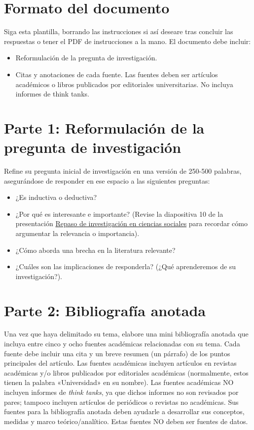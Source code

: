 \documentclass[11pt]{article}
\begin{document}
\section*{Formato del documento}
Siga esta plantilla, borrando las instrucciones si así deseare tras concluir las respuestas o tener el PDF de instrucciones a la mano. El documento debe incluir:
\begin{itemize}
    \item Reformulación de la pregunta de investigación.
    \item Citas y anotaciones de cada fuente. Las fuentes deben ser artículos académicos o libros publicados por editoriales universitarias. No incluya informes de think tanks.
\end{itemize}
\onehalfspacing
\section*{Parte 1: Reformulación de la pregunta de investigación}

Refine su pregunta inicial de investigación en una versión de 250-500 palabras, asegurándose de responder en ese espacio a las siguientes preguntas:
\begin{itemize}
    \item ¿Es inductiva o deductiva?
    \item ¿Por qué es interesante e importante? (Revise la diapositiva 10 de la presentación \href{https://github.com/RashidCJ/SOCI-4186/blob/main/Gu%C3%ADas%20y%20manuales%204186/Repaso%20de%20investigaci%C3%B3n%20en%20ciencias%20sociales.pdf}{Repaso de investigación en ciencias sociales} para recordar cómo argumentar la relevancia o importancia).
    \item ¿Cómo aborda una brecha en la literatura relevante?
    \item ¿Cuáles son las implicaciones de responderla? (¿Qué aprenderemos de su investigación?).
\end{itemize}

\section*{Parte 2: Bibliografía anotada}

Una vez que haya delimitado su tema, elabore una mini bibliografía anotada que incluya entre cinco y ocho fuentes académicas relacionadas con su tema. Cada fuente debe incluir una cita y un breve resumen (un párrafo) de los puntos principales del artículo. Las fuentes académicas incluyen artículos en revistas académicas y/o libros publicados por editoriales académicas (normalmente, estos tienen la palabra «Universidad» en su nombre). Las fuentes académicas NO incluyen informes de \textit{think tanks}, ya que dichos informes no son revisados por pares; tampoco incluyen artículos de periódicos o revistas no académicas. Sus fuentes para la bibliografía anotada deben ayudarle a desarrollar sus conceptos, medidas y marco teórico/analítico. Estas fuentes NO deben ser fuentes de datos.
\end{document}
